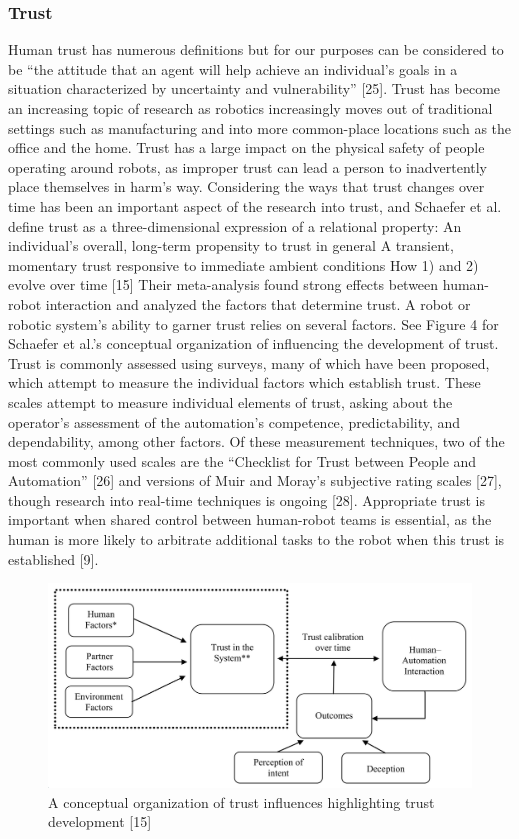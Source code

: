 \subsubsection{Trust}
Human trust has numerous definitions but for our purposes can be considered to be “the attitude that an agent will help achieve an individual’s goals in a situation characterized by uncertainty and vulnerability” [25]. Trust has become an increasing topic of research as robotics increasingly moves out of traditional settings such as manufacturing and into more common-place locations such as the office and the home. Trust has a large impact on the physical safety of people operating around robots, as improper trust can lead a person to inadvertently place themselves in harm’s way. Considering the ways that trust changes over time has been an important aspect of the research into trust, and Schaefer et al. define trust as a three-dimensional expression of a relational property:
	An individual's overall, long-term propensity to trust in general
	A transient, momentary trust responsive to immediate ambient conditions
	How 1) and 2) evolve over time [15]
Their meta-analysis found strong effects between human-robot interaction and analyzed the factors that determine trust. A robot or robotic system's ability to garner trust relies on several factors. See Figure 4 for Schaefer et al.'s conceptual organization of influencing the development of trust. Trust is commonly assessed using surveys, many of which have been proposed, which attempt to measure the individual factors which establish trust. These scales attempt to measure individual elements of trust, asking about the operator’s assessment of the automation’s competence, predictability, and dependability, among other factors. Of these measurement techniques, two of the most commonly used scales are the “Checklist for Trust between People and Automation” [26] and versions of Muir and Moray’s subjective rating scales [27], though research into real-time techniques is ongoing [28]. Appropriate trust is important when shared control between human-robot teams is essential, as the human is more likely to arbitrate additional tasks to the robot when this trust is established [9].

\begin{figure}[b!]
    \begin{center}
        \includegraphics[width=0.8\linewidth]{figures/TradeStudy/figure4.png}
        \caption{A conceptual organization of trust influences highlighting trust development [15]}
    \end{center}
\end{figure}

